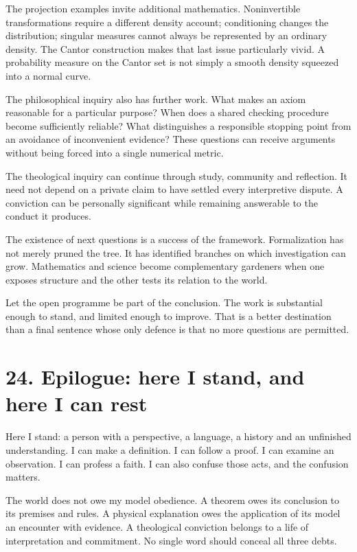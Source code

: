 \documentclass[10pt]{article}
\begin{document}
The projection examples invite additional mathematics. Noninvertible transformations require a different density account; conditioning changes the distribution; singular measures cannot always be represented by an ordinary density. The Cantor construction makes that last issue particularly vivid. A probability measure on the Cantor set is not simply a smooth density squeezed into a normal curve.

The philosophical inquiry also has further work. What makes an axiom reasonable for a particular purpose? When does a shared checking procedure become sufficiently reliable? What distinguishes a responsible stopping point from an avoidance of inconvenient evidence? These questions can receive arguments without being forced into a single numerical metric.

The theological inquiry can continue through study, community and reflection. It need not depend on a private claim to have settled every interpretive dispute. A conviction can be personally significant while remaining answerable to the conduct it produces.

The existence of next questions is a success of the framework. Formalization has not merely pruned the tree. It has identified branches on which investigation can grow. Mathematics and science become complementary gardeners when one exposes structure and the other tests its relation to the world.

Let the open programme be part of the conclusion. The work is substantial enough to stand, and limited enough to improve. That is a better destination than a final sentence whose only defence is that no more questions are permitted.

\clearpage
\section*{24. Epilogue: here I stand, and here I can rest}
Here I stand: a person with a perspective, a language, a history and an unfinished understanding. I can make a definition. I can follow a proof. I can examine an observation. I can profess a faith. I can also confuse those acts, and the confusion matters.

The world does not owe my model obedience. A theorem owes its conclusion to its premises and rules. A physical explanation owes the application of its model an encounter with evidence. A theological conviction belongs to a life of interpretation and commitment. No single word should conceal all three debts.
\end{document}
